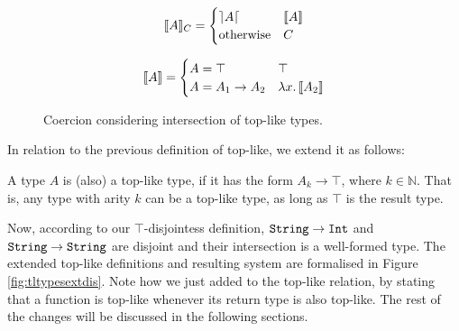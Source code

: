 \begin{figure}[t]
  \[
  \llbracket A \rrbracket_{C} = 
  \begin{cases} 
        \rceil A \lceil & \llbracket A \rrbracket \\ 
        \text{otherwise} & {C} 
  \end{cases}
  \]

  \[
  \llbracket A \rrbracket = 
  \begin{cases} 
        A = \top & \top \\
        A = A_1 \to A_2 & \lambda x.\, \llbracket A_2 \rrbracket \\
  \end{cases}
  \]


  \caption{Coercion considering intersection of top-like types.}
  \label{fig:andcoercion}
\end{figure}

In relation to the previous definition of top-like, we extend it as follows:
\begin{definition}
  
  A type $A$ is (also) a top-like type, if it has the form $A_k \to \top$, where $k \in \mathbb{N}$. 
  That is, any type with arity $k$ can be a top-like type, as long as $\top$ is the result type. 

\end{definition}

Now, according to our $\top$-disjointess definition,
$\texttt{String} \to \texttt{Int}$ and $\texttt{String} \to \texttt{String}$ are disjoint and their intersection is a 
well-formed type.
The extended top-like definitions and resulting system are formalised in Figure \ref{fig:tltypesextdis}.
Note how we just added  to the top-like relation, by stating that a function is top-like whenever
its return type is also top-like.
The rest of the changes will be discussed in the following sections.

